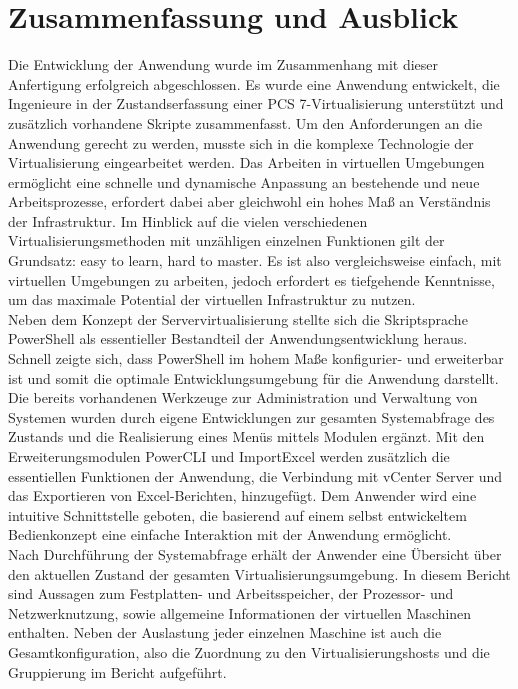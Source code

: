 \chapter{Zusammenfassung und Ausblick}
Die Entwicklung der Anwendung wurde im Zusammenhang mit dieser Anfertigung erfolgreich abgeschlossen. Es wurde eine Anwendung entwickelt, die Ingenieure in der Zustandserfassung einer PCS 7-Virtualisierung unterstützt und zusätzlich vorhandene Skripte zusammenfasst. Um den Anforderungen an die Anwendung gerecht zu werden, musste sich in die komplexe Technologie der Virtualisierung eingearbeitet werden. Das Arbeiten in virtuellen Umgebungen ermöglicht eine schnelle und dynamische Anpassung an bestehende und neue Arbeitsprozesse, erfordert dabei aber gleichwohl ein hohes Maß an Verständnis der Infrastruktur. Im Hinblick auf die vielen verschiedenen Virtualisierungsmethoden mit unzähligen einzelnen Funktionen gilt der Grundsatz: \glqq easy to learn, hard to master\grqq{}. Es ist also vergleichsweise einfach, mit virtuellen Umgebungen zu arbeiten, jedoch erfordert es tiefgehende Kenntnisse, um das maximale Potential der virtuellen Infrastruktur zu nutzen.\medskip\\ 
Neben dem Konzept der Servervirtualisierung stellte sich die Skriptsprache PowerShell als essentieller Bestandteil der Anwendungsentwicklung heraus. Schnell zeigte sich, dass PowerShell im hohem Maße konfigurier- und erweiterbar ist und somit die optimale Entwicklungsumgebung für die Anwendung darstellt.
Die bereits vorhandenen Werkzeuge zur Administration und Verwaltung von Systemen wurden durch eigene Entwicklungen zur gesamten Systemabfrage des Zustands und die Realisierung eines Menüs mittels Modulen ergänzt. Mit den Erweiterungsmodulen PowerCLI und ImportExcel werden zusätzlich die essentiellen Funktionen der Anwendung, die Verbindung mit vCenter Server und das Exportieren von Excel-Berichten, hinzugefügt. Dem Anwender wird eine intuitive Schnittstelle geboten, die basierend auf einem selbst entwickeltem Bedienkonzept eine einfache Interaktion mit der Anwendung ermöglicht.\medskip\\
Nach Durchführung der Systemabfrage erhält der Anwender eine Übersicht über den aktuellen Zustand der gesamten Virtualisierungsumgebung. In diesem Bericht sind Aussagen zum Festplatten- und Arbeitsspeicher, der Prozessor- und Netzwerknutzung, sowie allgemeine Informationen der virtuellen Maschinen enthalten. Neben der Auslastung jeder einzelnen Maschine ist auch die Gesamtkonfiguration, also die Zuordnung zu den Virtualisierungshosts und die Gruppierung im Bericht aufgeführt.\medskip\\
